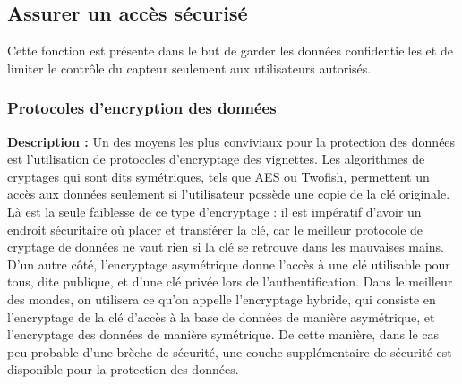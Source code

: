 \begin{table}[!htb]
\footnotesize
\centering
{}
\caption{Évaluation globale des concepts pour afficher les données}
\label{t:Decision_affichage}
\end{table}


\subsection{Assurer un accès sécurisé}
Cette fonction est présente dans le but de garder les données confidentielles et de limiter le contrôle du capteur seulement aux utilisateurs autorisés. %


\subsubsection{Protocoles d’encryption des données}

\textbf{Description :} Un des moyens les plus conviviaux pour la protection des données est l’utilisation de protocoles d’encryptage des vignettes. Les algorithmes de cryptages qui sont dits symétriques, tels que AES ou Twofish, permettent un accès aux données seulement si l’utilisateur possède une copie de la clé originale. Là est la seule faiblesse de ce type d’encryptage : il est impératif d’avoir un endroit sécuritaire où placer et transférer la clé, car le meilleur protocole de cryptage de données ne vaut rien si la clé se retrouve dans les mauvaises mains. D’un autre côté, l’encryptage asymétrique donne l’accès à une clé utilisable pour tous, dite publique, et d’une clé privée lors de l’authentification. Dans le meilleur des mondes, on utilisera ce qu’on appelle l’encryptage hybride, qui consiste en l’encryptage de la clé d’accès à la base de données de manière asymétrique, et l’encryptage des données de manière symétrique. De cette manière, dans le cas peu probable d’une brèche de sécurité, une couche supplémentaire de sécurité est disponible pour la protection des données.

